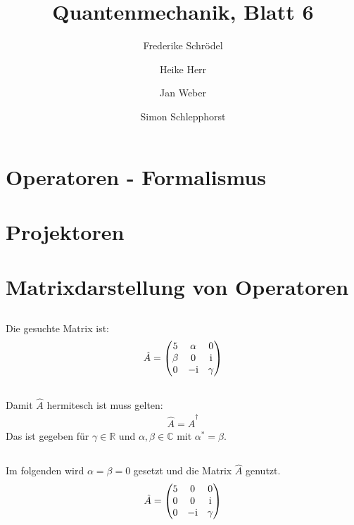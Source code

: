 \documentclass[11pt, ngerman, fleqn, DIV=15, headinclude]{scrartcl}
\title{Quantenmechanik, Blatt 6}
\author{
    Frederike Schrödel \and Heike Herr \and Jan Weber \and Simon Schlepphorst
}
\begin{document}
\maketitle

\section{Operatoren - Formalismus}

\section{Projektoren}

\section{Matrixdarstellung von Operatoren}

\subsection{ }
Die gesuchte Matrix ist:
\begin{align*}
	\hat A = \begin{pmatrix}
		5 & \alpha & 0\\
		\beta & 0 & \mathrm i\\
		0 & -\mathrm i & \gamma
	\end{pmatrix}
\end{align*}

\subsection{ }
Damit $\hat A$ hermitesch ist muss gelten:
\begin{align*}
	\hat A = \hat A^\dagger
\end{align*}
Das ist gegeben für $\gamma \in \mathbb R$ und $\alpha, \beta \in \mathbb C$
mit $\alpha^* = \beta$.

\subsection{ }
Im folgenden wird $\alpha = \beta = 0$ gesetzt und die Matrix $\hat A$ genutzt.
\begin{align*}
	\hat A = \begin{pmatrix}
		5 & 0 & 0\\
		0 & 0 & \mathrm i\\
		0 & -\mathrm i & \gamma
	\end{pmatrix}
\end{align*}
\end{document}
